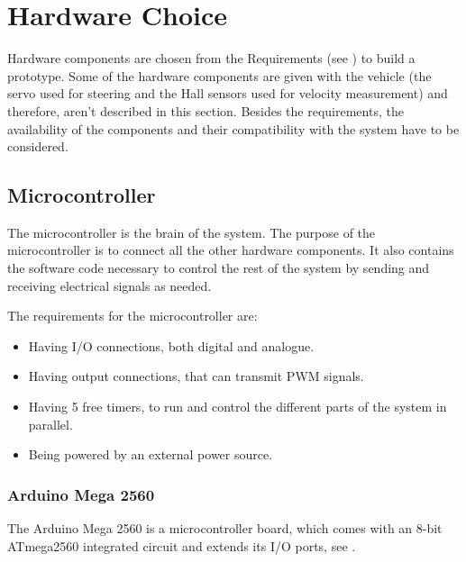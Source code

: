 \section{Hardware Choice} \label{Hardwarechoice}
Hardware components are chosen from the Requirements (see ) to build a prototype. 
Some of the hardware components are given with the vehicle (the servo used for steering and the Hall sensors used for velocity measurement) and therefore, aren't described in this section. 
Besides the requirements, the availability of the components and their compatibility with the system have to be considered.


\subsection{Microcontroller}
The microcontroller is the brain of the system. The purpose of the microcontroller is to connect all the other hardware components. It also contains the software code necessary to control the rest of the system by sending and receiving electrical signals as needed.

The requirements for the microcontroller are:
\begin{itemize}
\item Having I/O connections, both digital and analogue.
\item Having output connections, that can transmit PWM signals.
\item Having 5 free timers, to run and control the different parts of the system in parallel.
\item Being powered by an external power source.
\end{itemize}

\subsubsection{Arduino Mega 2560}
The Arduino Mega 2560 is a microcontroller board, which comes with an 8-bit ATmega2560 integrated circuit and extends its I/O ports, see  \cite{MegaInfo}. 

